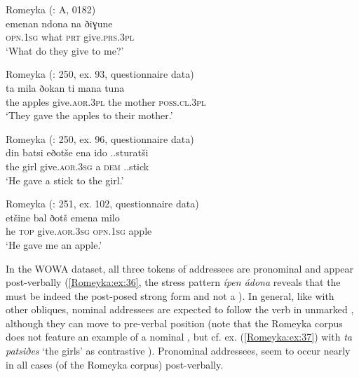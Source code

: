 \documentclass[output=paper,colorlinks,citecolor=brown]{langscibook}
\begin{document}
\ea\label{Romeyka:ex:32}
Romeyka (\citealt{schreiber2021pontic}: A, 0182) \\
\gll emenan ndona na ðiɣune \\
\textsc{opn.1sg} what \textsc{prt} give\textsc{.prs.3pl} \\
\glt `What do they give to me?'  \\
\z

\ea\label{Romeyka:ex:33}
Romeyka (\citealt{schreibergrammar2022}: 250, ex. 93, questionnaire data) \\
\gll ta mila ðokan ti mana tuna \\
the apples give\textsc{.aor.3pl} the mother \textsc{poss.cl.3pl} \\
\glt `They gave the apples to their mother.'  \\
\z

\ea\label{Romeyka:ex:34}
Romeyka (\citealt{schreibergrammar2022}: 250, ex. 96, questionnaire data) \\
\gll din batsi eðotše ena ido ..sturatši \\
the girl give\textsc{.aor.3sg} a \textsc{dem} ..stick \\
\glt `He gave a stick to the girl.'  \\
\z

\ea\label{Romeyka:ex:35}
Romeyka (\citealt{schreibergrammar2022}: 251, ex. 102, questionnaire data) \\
\gll etšine bal ðotš emena milo \\
he \textsc{top} give\textsc{.aor.3sg} \textsc{opn.1sg} apple \\
\glt `He gave me an apple.'  \\
\z

In the WOWA dataset, all three tokens of addressees are pronominal and appear post-verbally (\ref{Romeyka:ex:36}, the stress pattern \textit{ípen ádona} reveals that the  must be indeed the post-posed strong form and not a ). In general, like with other obliques, nominal addressees are expected to follow the verb in unmarked , although they can move to pre-verbal  position (note that the Romeyka corpus does not feature an example of a nominal , but cf. ex. (\ref{Romeyka:ex:37}) with \textit{ta patsiðes} `the girls' as contrastive ). Pronominal addressees, seem to occur nearly in all cases (of the Romeyka corpus) post-verbally.
\end{document}
